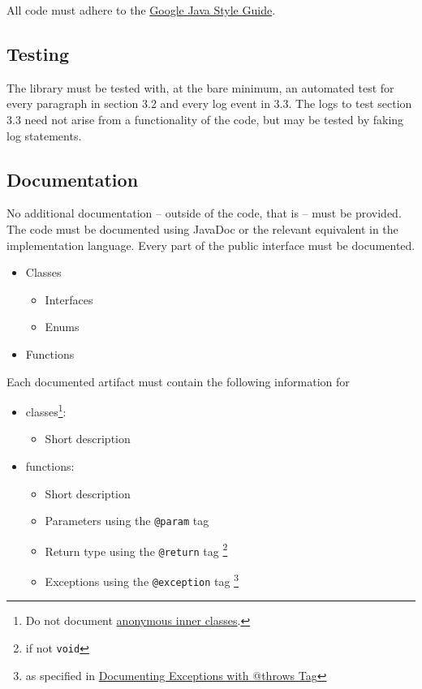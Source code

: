 \documentclass[11pt]{article} %
\begin{document}
    All code must adhere to the \href{https://google.github.io/styleguide/javaguide.html}{Google Java Style Guide}.


    \subsection{Testing}\label{sec:3.5}

    The library must be tested with, at the bare minimum, an automated test for every paragraph in section 3.2 and every log event in 3.3. The logs to test section 3.3 need not arise from a functionality of the code, but may be tested by faking log statements.


    \subsection{Documentation}\label{sec:3.6}

    No additional documentation -- outside of the code, that is -- must be provided. The code must be documented using JavaDoc or the relevant equivalent in the implementation language. Every part of the public interface must be documented.

    \begin{itemize}
        \item Classes
        \begin{itemize}
            \item Interfaces
            \item Enums
        \end{itemize}
        \item Functions
    \end{itemize}

    Each documented artifact must contain the following information for

    \begin{itemize}
        \item[] classes\footnote{Do not document \href{https://www.oracle.com/technical-resources/articles/java/javadoc-tool.html#anonymous}{anonymous inner classes}.}:
        \begin{itemize}
            \item Short description
        \end{itemize}
        \item[] functions:
        \begin{itemize}
            \item Short description
            \item Parameters using the \verb|@param| tag
            \item Return type using the \verb|@return| tag \footnote{if not \verb|void|}
            \item Exceptions using the \verb|@exception| tag \footnote{as specified in \href{https://www.oracle.com/technical-resources/articles/java/javadoc-tool.html#throwstag}{Documenting Exceptions with @throws Tag}}
        \end{itemize}
    \end{itemize}
\end{document}
